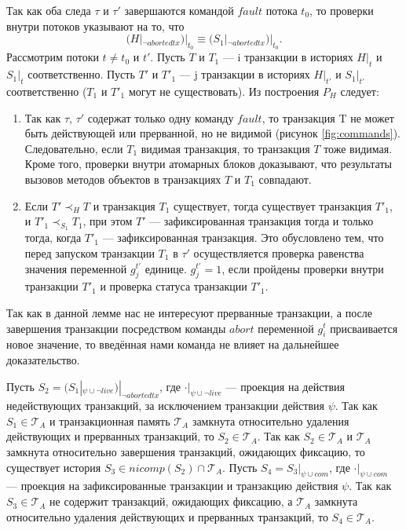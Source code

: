 \begin{myproof}
Так как оба следа $\tau$ и $\tau'$ завершаются командой $fault$ потока $t_0$, то проверки внутри потоков указывают на то, что \begin{equation} \label{eq:hist_fault}
(H|_{\neg abortedtx})|_{t_0} \equiv ({S_1}|_{\neg abortedtx})|_{t_0}. 
\end{equation}
Рассмотрим потоки $t \neq t_0$ и $t'$. Пусть $T$ и $T_1$ --- i транзакции в историях $H|_t$ и ${S_1}|_t$ соответственно. Пусть $T'$ и $T'_1$ --- j транзакции в историях $H|_{t'}$ и ${S_1}|_{t'}$ соответственно ($T_1$ и $T'_1$ могут не существовать). Из построения $P_H$ следует:
\begin{enumerate}
\item Так как $\tau$, $\tau'$ содержат только одну команду $fault$, то транзакция T не может быть действующей или прерванной, но не видимой (рисунок \ref{fig:commands}). Следовательно, если $T_1$ видимая транзакция, то транзакция $T$ тоже видимая. Кроме того, проверки внутри атомарных блоков доказывают, что результаты вызовов методов объектов в транзакциях $T$ и $T_1$ совпадают.  
\item Если $T' \prec_H T$ и транзакция $T_1$ существует, тогда существует транзакция $T'_1$, и $T'_1 \prec_{S_1} T_1$, при этом $T'$ --- зафиксированная транзакция тогда и только тогда, когда $T'_1$ --- зафиксированная транзакция. Это обусловлено тем, что перед запуском транзакции $T_1$ в $\tau'$ осуществляется проверка равенства значения переменной $g^{t'}_j$ единице. $g^{t'}_j = 1$, если пройдены проверки внутри транзакции $T'_1$ и проверка статуса транзакции $T'_1$.   
\end{enumerate}

Так как в данной лемме нас не интересуют прерванные транзакции, а после завершения транзакции посредством команды $abort$ переменной $g^t_i$ присваивается новое значение, то введённая нами команда не влияет на дальнейшее доказательство. 

Пусть $S_2 = (S_1|_{\psi\cup{\neg live}})|_{\neg abortedtx}$, где $\cdot|_{\psi \cup {\neg live}}$ --- проекция на действия недействующих транзакций, за исключением транзакции действия $\psi$. Так как $S_1 \in \mathcal{T}_A$ и транзакционная память $\mathcal{T}_A$ замкнута относительно удаления действующих и прерванных транзакций, то $S_2 \in \mathcal{T}_A$. Так как $S_2 \in \mathcal{T}_A$ и $\mathcal{T}_A$ замкнута относительно завершения транзакций, ожидающих фиксацию, то существует история $S_3 \in nicomp(S_2) \cap \mathcal{T}_A$. Пусть $S_4 = S_3|_{\psi \cup com}$, где $\cdot|_{\psi \cup com}$ --- проекция на зафиксированные транзакции и транзакцию действия $\psi$. Так как $S_3 \in \mathcal{T}_A$ не содержит транзакций, ожидающих фиксацию, а $\mathcal{T}_A$ замкнута относительно удаления действующих и прерванных транзакций, то $S_4 \in \mathcal{T}_A$.


\end{myproof}
